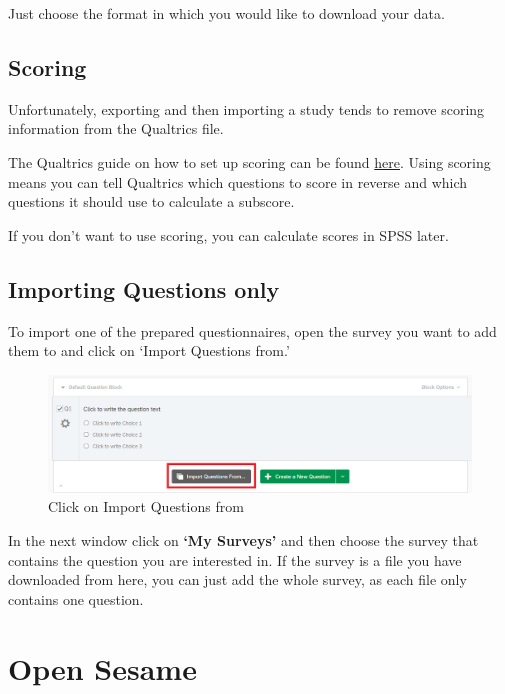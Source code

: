 \documentclass[
]{book}
\begin{document}
Just choose the format in which you would like to download your data.

\hypertarget{scoring}{%
\section{Scoring}\label{scoring}}

Unfortunately, exporting and then importing a study tends to remove scoring information from the Qualtrics file.

The Qualtrics guide on how to set up scoring can be found \href{https://www.qualtrics.com/support/survey-platform/survey-module/survey-tools/scoring/}{here}. Using scoring means you can tell Qualtrics which questions to score in reverse and which questions it should use to calculate a subscore.

If you don't want to use scoring, you can calculate scores in SPSS later.

\hypertarget{importing-questions-only}{%
\section{Importing Questions only}\label{importing-questions-only}}

To import one of the prepared questionnaires, open the survey you want to add them to and click on `Import Questions from.'

\begin{figure}

{\centering \includegraphics[width=0.85\linewidth]{images/Qualtrics/import} 

}

\caption{Click on Import Questions from}\label{fig:Figure11-16}
\end{figure}

In the next window click on \textbf{`My Surveys'} and then choose the survey that contains the question you are interested in. If the survey is a file you have downloaded from here, you can just add the whole survey, as each file only contains one question.

\hypertarget{open-sesame}{%
\chapter{Open Sesame}\label{open-sesame}}
\end{document}
